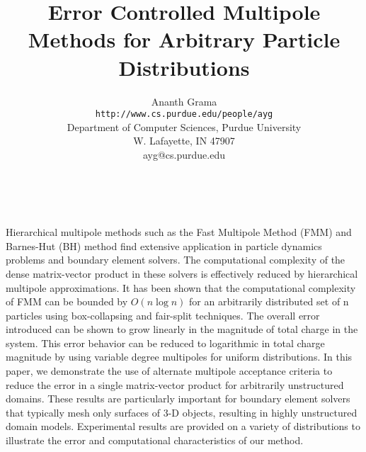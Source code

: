 \documentclass[11pt]{article}
\date{ ~ \hspace{-4mm}}
\title{Error Controlled Multipole Methods for Arbitrary Particle Distributions  }
\author{Ananth Grama \\ {\tt http://www.cs.purdue.edu/people/ayg} \\ Department of Computer Sciences, Purdue University  \\  W. Lafayette, IN 47907 \\ ayg@cs.purdue.edu}
\begin{document}
\maketitle
\thispagestyle{empty}






Hierarchical multipole methods such as the Fast Multipole Method (FMM)
and Barnes-Hut (BH) method find extensive application in particle
dynamics problems and boundary element solvers. The computational complexity
of the dense matrix-vector product in these solvers is effectively reduced
by hierarchical multipole approximations. It has been shown that the
computational complexity of FMM can be bounded by $O(n \log n)$
for an arbitrarily
distributed set of n particles using box-collapsing and fair-split techniques.
The overall error introduced can be shown to grow linearly in the magnitude
of total charge in the system. This error behavior can be reduced to
logarithmic in total charge magnitude by using variable degree multipoles
for uniform distributions. In this paper, we demonstrate the use of alternate
multipole acceptance criteria to reduce the error in a single matrix-vector
product for arbitrarily unstructured domains. These results are particularly
important for boundary element solvers that typically mesh only surfaces of
3-D objects, resulting in highly unstructured domain models.
Experimental results are provided on a variety of distributions to
illustrate the error and computational characteristics of our method.
\end{document}
